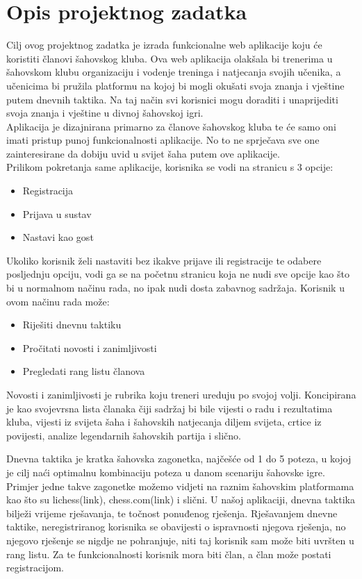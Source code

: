 \documentclass{article}
\begin{document}
	\section{Opis projektnog zadatka}
		Cilj ovog projektnog zadatka je izrada funkcionalne web aplikacije koju će koristiti članovi šahovskog kluba. Ova web aplikacija olakšala bi trenerima u šahovskom klubu organizaciju i vodenje treninga i natjecanja svojih učenika, a učenicima bi pružila platformu na kojoj bi mogli okušati svoja znanja i vještine putem dnevnih taktika. Na taj način svi korisnici mogu doraditi i unaprijediti svoja znanja i vještine u divnoj šahovskoj igri. \\ 
		Aplikacija je dizajnirana primarno za članove šahovskog kluba te će samo oni imati pristup punoj funkcionalnosti aplikacije. No to ne sprječava sve one zainteresirane da dobiju uvid u svijet šaha putem ove aplikacije. \\
		Prilikom pokretanja same aplikacije, korisnika se vodi na stranicu s 3 opcije:
		\begin{itemize}
			\item Registracija
			\item Prijava u sustav
			\item  Nastavi kao gost
		\end{itemize}
		Ukoliko korisnik želi nastaviti bez ikakve prijave ili registracije te odabere posljednju opciju, vodi ga se na početnu stranicu koja ne nudi sve opcije kao što bi u normalnom načinu rada, no ipak nudi dosta zabavnog sadržaja. Korisnik u ovom načinu rada može:
		\begin{itemize}
			\item Riješiti dnevnu taktiku 
			\item Pročitati novosti i zanimljivosti 
			\item Pregledati rang listu članova 
		\end{itemize}
		Novosti i zanimljivosti je rubrika koju treneri ureduju po svojoj volji. Koncipirana je kao svojevrsna lista članaka čiji sadržaj bi bile vijesti o radu i rezultatima kluba, vijesti iz svijeta šaha i šahovskih natjecanja diljem svijeta, crtice iz povijesti, analize legendarnih šahovskih partija i slično. 
		
		Dnevna taktika je kratka šahovska zagonetka, najčešće od 1 do 5 poteza, u kojoj je cilj naći optimalnu kombinaciju poteza u danom scenariju šahovske igre. Primjer jedne takve zagonetke možemo vidjeti na raznim šahovskim platformama kao što su lichess(link), chess.com(link) i slični. U našoj aplikaciji, dnevna taktika bilježi vrijeme rješavanja, te točnost ponuđenog rješenja. Rješavanjem dnevne taktike, neregistriranog korisnika se obavijesti o ispravnosti njegova rješenja, no njegovo rješenje se nigdje ne pohranjuje, niti taj korisnik sam može biti uvršten u rang listu. Za te funkcionalnosti korisnik mora biti član, a član može postati registracijom.\\
		
\end{document}
